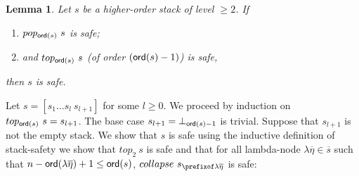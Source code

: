 \documentclass{article}
\newtheorem{lemma}{Lemma}[section]
\theoremstyle{remark}
\theoremstyle{definition}
\newcommand\orddec\overline
\begin{document}
\begin{lemma}
\label{lem:cons_qsafety} Let $s$ be a higher-order stack of level $\geq 2$. If
\begin{enumerate}[1.]
\item $pop_{{\sf ord}(s)}~s$ is safe;
\item and $top_{{\sf ord}(s)}~s$ (of order $({\sf ord}(s)-1)$) is safe,
\end{enumerate}
then $s$ is safe.
\end{lemma}
\proof
Let $s = [s_1 \ldots s_l~s_{l+1}]$ for some $l\geq0$.
We proceed by induction on  $top_{{\sf ord}(s)}~s=s_{l+1}$.
The base case $s_{l+1} = \bot_{{\sf ord}(s)-1}$ is trivial.
Suppose that $s_{l+1}$ is not the empty stack. We show that $s$ is safe using the inductive definition of stack-safety \ie we show that $top_2~s$ is safe and that for all lambda-node $\lambda \overline{\eta} \in \orddec{s}$ such that $n-{\sf ord}(\lambda \overline{\eta})+1 \leq {\sf ord}(s)$, $collapse~s_{\prefixof \lambda \overline{\eta}}$ is safe:
\end{document}
